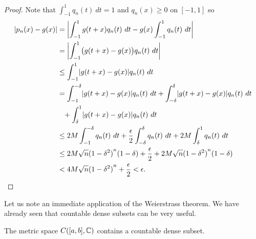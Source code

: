\begin{proof}
Note that 
$\int_{-1}^1 q_n(t) ~ dt = 1$ and $q_n(x) \geq 0$ on $[-1,1]$ so
\begin{equation*}
\begin{split}
\lvert {p_n(x)-g(x)} \rvert & =
\left\lvert {\int_{-1}^1 g(t+x)q_n(t) ~ dt
-g(x)\int_{-1}^1 q_n(t) ~ dt} \right\rvert \\
& =
\left\lvert {\int_{-1}^1 \bigl(g(t+x)-g(x)\bigr)q_n(t) ~ dt} \right\rvert \\
& \leq
\int_{-1}^1 \lvert {g(t+x)-g(x)} \rvert q_n(t) ~ dt \\
& =
\int_{-1}^{-\delta} \lvert {g(t+x)-g(x)} \rvert q_n(t) ~ dt
+
\int_{-\delta}^{\delta} \lvert {g(t+x)-g(x)} \rvert q_n(t) ~ dt
\\
& \phantom{\leq} +
\int_{\delta}^1 \lvert {g(t+x)-g(x)} \rvert q_n(t) ~ dt \\
& \leq
2M
\int_{-1}^{-\delta} q_n(t) ~ dt
+
\frac{\epsilon}{2}
\int_{-\delta}^{\delta} q_n(t) ~ dt
+
2M
\int_{\delta}^1 q_n(t) ~ dt \\
& \leq
2M\sqrt{n}{(1-\delta^2)}^n(1-\delta)
+
\frac{\epsilon}{2}
+
2M\sqrt{n}{(1-\delta^2)}^n(1-\delta) \\
& <
4M\sqrt{n}{(1-\delta^2)}^n
+
\frac{\epsilon}{2}
< \epsilon . \qedhere
\end{split}
\end{equation*}
\end{proof}


Let us note an immediate application of the Weierstrass theorem.  We have
already seen that countable dense subsets can be very useful.

\begin{cor}
The metric space $C([a,b],{\mathbb{C}})$ contains a countable dense subset.
\end{cor}


